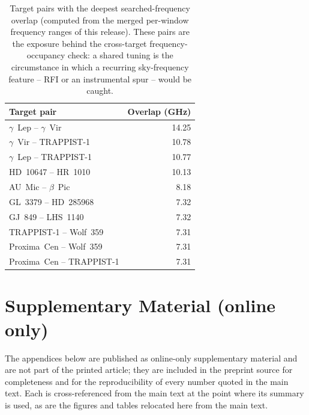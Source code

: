 \documentclass{openjournal}
\begin{document}
\begin{table}
\centering
\small
\caption{Target pairs with the deepest searched-frequency overlap
(computed from the merged per-window frequency ranges of this
release). These pairs are the exposure behind the cross-target
frequency-occupancy check: a shared tuning is the circumstance in
which a recurring sky-frequency feature -- RFI or an instrumental
spur -- would be caught.}
\label{tab:pairs}
\begin{tabular}{@{}lr@{}}
\hline
Target pair & Overlap (GHz) \\
\hline
$\gamma$~Lep -- $\gamma$~Vir & 14.25 \\
$\gamma$~Vir -- TRAPPIST-1 & 10.78 \\
$\gamma$~Lep -- TRAPPIST-1 & 10.77 \\
HD~10647 -- HR~1010 & 10.13 \\
AU~Mic -- $\beta$~Pic & 8.18 \\
GL~3379 -- HD~285968 & 7.32 \\
GJ~849 -- LHS~1140 & 7.32 \\
TRAPPIST-1 -- Wolf~359 & 7.31 \\
Proxima~Cen -- Wolf~359 & 7.31 \\
Proxima~Cen -- TRAPPIST-1 & 7.31 \\
\hline
\end{tabular}
\end{table}

\clearpage
\section*{Supplementary Material (online only)}
\label{sec:supplementary}
The appendices below are published as online-only
supplementary material and are not part of the printed article; they
are included in the preprint source for completeness and for the
reproducibility of every number quoted in the main text. Each is
cross-referenced from the main text at the point where its summary
is used, as are the figures and tables relocated here from the main
text.
\end{document}
